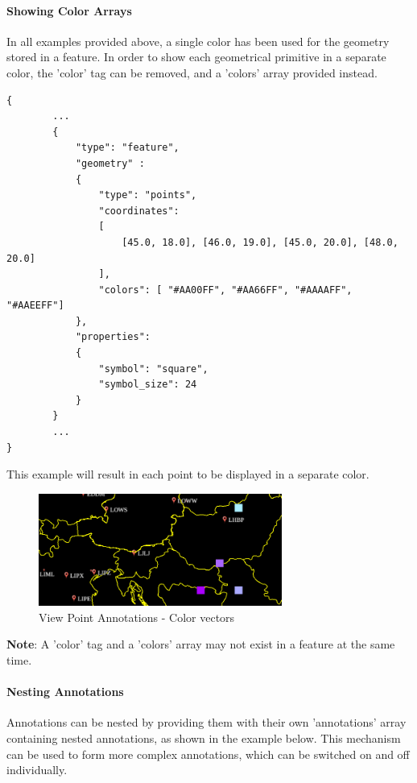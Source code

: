 \paragraph{Showing Color Arrays} In all examples provided above, a single color has been used for the geometry stored in a feature.
In order to show each geometrical primitive in a separate color, the 'color' tag can be removed, and a 'colors' array provided instead.

\begin{lstlisting}[basicstyle=\small\ttfamily]
{
        ...
        {
            "type": "feature",
            "geometry" :
            {
                "type": "points",
                "coordinates": 
                [
                    [45.0, 18.0], [46.0, 19.0], [45.0, 20.0], [48.0, 20.0]
                ],
                "colors": [ "#AA00FF", "#AA66FF", "#AAAAFF", "#AAEEFF"]
            },
            "properties":
            {
                "symbol": "square",
                "symbol_size": 24
            }
        }
        ...
}
\end{lstlisting}

This example will result in each point to be displayed in a separate color.

\begin{figure}[H]
    \center
        \includegraphics[width=8cm]{figures/viewpoints_anno_example_colorvec.png}
    \caption{View Point Annotations - Color vectors} 
\end{figure}

\textbf{Note}: A 'color' tag and a 'colors' array may not exist in a feature at the same time.

\paragraph{Nesting Annotations} Annotations can be nested by providing them with their own 'annotations' array containing nested 
annotations, as shown in the example below. This mechanism can be used to form more complex annotations, which can be switched on and off 
individually.

